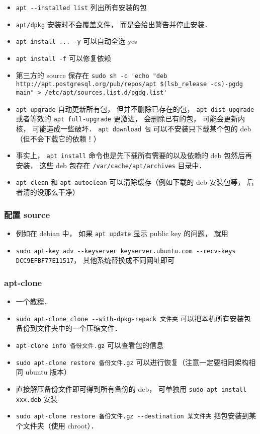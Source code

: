 \begin{itemize}
\item \verb|apt --installed list| 列出所有安装的包
\item \verb|apt/dpkg| 安装时不会覆盖文件， 而是会给出警告并停止安装．
\item \verb|apt install ... -y| 可以自动全选 yes
\item \verb|apt install -f| 可以修复依赖
\item 第三方的 source 保存在 \verb|sudo sh -c 'echo "deb http://apt.postgresql.org/pub/repos/apt $(lsb_release -cs)-pgdg main" > /etc/apt/sources.list.d/pgdg.list'|
\item \verb|apt upgrade| 自动更新所有包， 但并不删除已存在的包， \verb|apt dist-upgrade| 或者等效的 \verb|apt full-upgrade| 更激进， 会删除已有的包， 可能会更新内核， 可能造成一些破坏．
\verb|apt download 包| 可以不安装只下载某个包的 deb （但不会下载它的依赖！）
\item 事实上， \verb|apt install| 命令也是先下载所有需要的以及依赖的 deb 包然后再安装， 这些 deb 包存在 \verb|/var/cache/apt/archives| 目录中．
\item \verb|apt clean| 和 \verb|apt autoclean| 可以清除缓存（例如下载的 deb 安装包等， 后者清的没那么干净）
\end{itemize}


\subsubsection{配置 source}
\begin{itemize}
\item 例如在 debian 中， 如果 \verb|apt update| 显示 public key 的问题， 就用
\item \verb|sudo apt-key adv --keyserver keyserver.ubuntu.com --recv-keys DCC9EFBF77E11517|， 其他系统替换成不同网址即可
\end{itemize}

\subsubsection{apt-clone}
\begin{itemize}
\item 一个\href{https://ubunlog.com/en/apt-clone-copia-seguridad-paquetes/}{教程}．
\item \verb|sudo apt-clone clone --with-dpkg-repack 文件夹| 可以把本机所有安装包备份到文件夹中的一个压缩文件．
\item \verb|apt-clone info 备份文件.gz| 可以查看包的信息
\item \verb|sudo apt-clone restore 备份文件.gz| 可以进行恢复（注意一定要相同架构相同 ubuntu 版本）
\item 直接解压备份文件即可得到所有备份的 deb， 可单独用 \verb|sudo apt install xxx.deb| 安装
\item \verb|sudo apt-clone restore 备份文件.gz --destination 某文件夹| 把包安装到某个文件夹（使用 chroot）．
\end{itemize}



